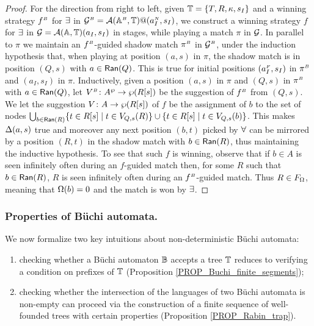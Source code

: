 \begin{proof}
For the direction from right to left, given $\mathbb{T} = \{ T,R,\kappa,s_I\}$ and a winning strategy $f^{{\scriptscriptstyle B}}$ for $\exists$ in $\mathcal{G}^{{\scriptscriptstyle B}} = \mathcal{A}(\mathbb{A}^{{\scriptscriptstyle B}},\mathbb{T})@(a_I^{{\scriptscriptstyle N}},s_I)$, we construct a winning strategy $f$ for $\exists$ in $\mathcal{G} = \mathcal{A}(\mathbb{A},\mathbb{T})(a_I,s_I)$ in stages, while playing a match $\pi$ in $\mathcal{G}$. In parallel to $\pi$ we maintain an $f^{{\scriptscriptstyle B}}$-guided shadow match $\pi^{{\scriptscriptstyle B}}$ in $\mathcal{G}^{{\scriptscriptstyle B}}$, under the induction hypothesis that, when playing at position $(a,s)$ in $\pi$, the shadow match is in position $(Q,s)$ with $a \in \mathsf{Ran}(Q)$. This is true for initial positions $(a_I^{{\scriptscriptstyle F}},s_I)$ in $\pi^{{\scriptscriptstyle B}}$ and $(a_I,s_I)$ in $\pi$. Inductively, given a position $(a,s)$ in $\pi$ and $(Q,s)$ in $\pi^{{\scriptscriptstyle B}}$ with $a \in \mathsf{Ran}(Q)$, let $V^{{\scriptscriptstyle B}} \colon A^{\wp} \rightarrow \wp (R[s])$ be the suggestion of $f^{{\scriptscriptstyle B}}$ from $(Q,s)$. We let the suggestion $V \colon A \rightarrow \wp (R[s])$ of $f$ be the assignment of $b$ to the set of nodes $\bigcup_{b \in \mathsf{Ran}(R)} \{t \in R[s] \mid t \in V_{Q,s}(R)\} \cup  \{t \in R[s] \mid t \in V_{Q,s}(b)\}$. This makes $\Delta(a,s)$ true and moreover any next position $(b,t)$ picked by $\forall$ can be mirrored by a position $(R,t)$ in the shadow match with $b \in \mathsf{Ran}(R)$, thus maintaining the inductive hypothesis. To see that such $f$ is winning, observe that if $b \in A$ is seen infinitely often during an $f$-guided match then, for some $R$ such that $b \in \mathsf{Ran}(R)$, $R$ is seen infinitely often during an $f^{{\scriptscriptstyle B}}$-guided match. Thus $R \in F_{\Omega}$, meaning that $\Omega(b) = 0$ and the match is won by $\exists$.
\end{proof}

\subsubsection{Properties of B\"{u}chi automata.}\label{sec:propsBuchi}

We now formalize two key intuitions about non-deterministic B\"{u}chi
automata:

\begin{enumerate}
\item checking whether a B\"{u}chi automaton $\mathbb{B}$
  accepts a tree $\mathbb{T}$ reduces to verifying a condition on prefixes of
  $\mathbb{T}$ (Proposition \ref{PROP_Buchi_finite_segments});
\item checking whether the intersection of the languages of two
   B\"{u}chi automata is non-empty can proceed via the
  construction of a finite sequence of well-founded trees with certain
  properties (Proposition \ref{PROP_Rabin_trap}).
\end{enumerate}

